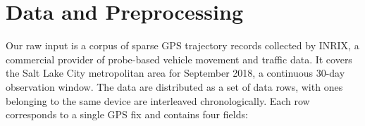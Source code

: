 \documentclass[sigconf, review]{acmart}
\begin{document}





\section{Data and Preprocessing}
\label{sec:dataset}

\label{sec:dataset-corpus}

Our raw input is a corpus of sparse GPS trajectory records collected by INRIX, a commercial provider of probe-based vehicle movement and traffic data. 
It covers the Salt Lake City metropolitan area for September 2018, a continuous $30$-day
observation window. 
The data are distributed as a set of data rows, with ones belonging to the same device are interleaved chronologically.  
Each row corresponds to a single GPS fix and contains
four fields:
\end{document}
